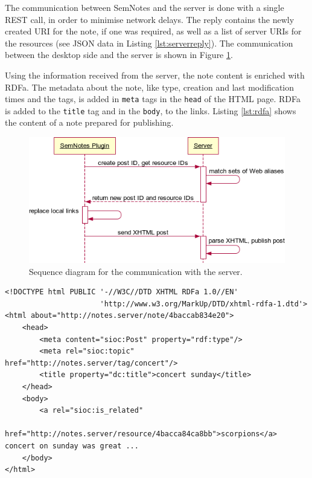 The communication between SemNotes and the server is done with a single REST call, in order to minimise network delays. The reply contains the newly created URI for the note, if one was required, as well as a list of server URIs for the resources (see JSON data in Listing \ref{lst:serverreply}). The communication between the desktop side and the server is shown in Figure \ref{fig:semblogsequencediag}. 

Using the information received from the server, the note content is enriched with RDFa. The metadata about the note, like type, creation and last modification times and the tags, is added in \verb|meta| tags in the \verb|head| of the HTML page. RDFa is added to the \verb|title| tag and in the \verb|body|, to the links. Listing \ref{lst:rdfa} shows the content of a note prepared for publishing.

\begin{figure}[htb]
  \begin{center}
    \includegraphics[width=0.85\linewidth]{chapters/core/img/sequencediagram}
    \caption{Sequence diagram for the communication with the server.}
    \label{fig:semblogsequencediag}
  \end{center}
\end{figure}

\setlength\parindent{0in}
\begin{minipage}[t]{\linewidth}
\begin{lstlisting}
<!DOCTYPE html PUBLIC '-//W3C//DTD XHTML RDFa 1.0//EN' 
                      'http://www.w3.org/MarkUp/DTD/xhtml-rdfa-1.dtd'>
<html about="http://notes.server/note/4baccab834e20">
    <head>
        <meta content="sioc:Post" property="rdf:type"/>
        <meta rel="sioc:topic" href="http://notes.server/tag/concert"/>
        <title property="dc:title">concert sunday</title>
    </head>
    <body>
        <a rel="sioc:is_related"
             href="http://notes.server/resource/4bacca84ca8bb">scorpions</a> concert on sunday was great ...
    </body>
</html>
\end{lstlisting}
\end{minipage}
\setlength\parindent{0.21in}
